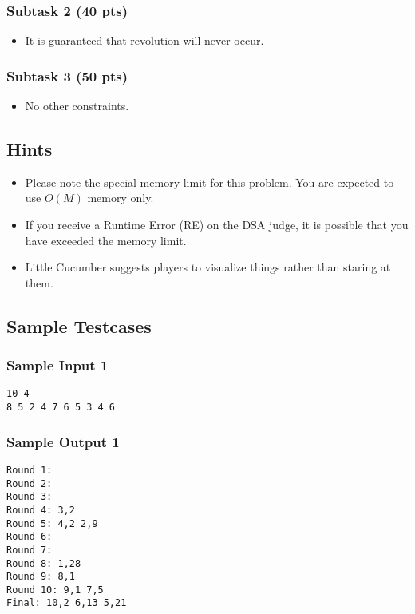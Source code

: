 \subsubsection{Subtask 2 (40 pts)}\label{subtask-2}

\begin{itemize}
\tightlist
\item It is guaranteed that revolution will never occur. 
\end{itemize}

\subsubsection{Subtask 3 (50 pts)}\label{subtask-3}

\begin{itemize}
\tightlist
\item No other constraints.
\end{itemize}

\subsection{Hints}
\begin{itemize}
    \item Please note the special memory limit for this problem. You are expected to use $O(M)$ memory only.
    \item If you receive a Runtime Error (RE) on the DSA judge, it is possible that you have exceeded the memory limit.
    \item Little Cucumber suggests players to visualize things rather than staring at them.
\end{itemize}

\newpage

\subsection{Sample Testcases}

\subsubsection{Sample Input 1}\label{sample-input-1}
\begin{verbatim}
10 4
8 5 2 4 7 6 5 3 4 6
\end{verbatim}

\subsubsection{Sample Output 1}\label{sample-output-1}
\begin{verbatim}
Round 1:
Round 2:
Round 3:
Round 4: 3,2
Round 5: 4,2 2,9
Round 6:
Round 7:
Round 8: 1,28
Round 9: 8,1
Round 10: 9,1 7,5
Final: 10,2 6,13 5,21
\end{verbatim}

